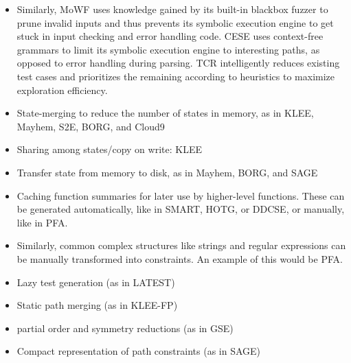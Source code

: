 \documentclass{article}
\begin{document}
\begin{multicols}{2}
\begin{itemize}
        \item Similarly, MoWF\cite{MoWF} uses knowledge gained by its built-in blackbox fuzzer to prune invalid inputs and thus prevents its symbolic execution engine to get stuck in input checking and error handling code. CESE\cite{CESE} uses context-free grammars to limit its symbolic execution engine to interesting paths, as opposed to error handling during parsing. TCR\cite{TCR} intelligently reduces existing test cases and prioritizes the remaining according to heuristics to maximize exploration efficiency.
        \item State-merging to reduce the number of states in memory, as in KLEE\cite{KLEE}, Mayhem\cite{Mayhem}, S2E\cite{S2E}, BORG\cite{BORG}, and Cloud9\cite{Cloud9}
        \item Sharing among states/copy on write: KLEE\cite{KLEE}
        \item Transfer state from memory to disk, as in Mayhem\cite{Mayhem}, BORG\cite{BORG}, and SAGE\cite{SAGE}
        \item Caching function summaries for later use by higher-level functions. These can be generated automatically, like in SMART\cite{SMART}, HOTG\cite{HigherOrderTestGeneration}, or DDCSE\cite{DDCSE}, or manually, like in PFA\cite{PFA}.
        \item Similarly, common complex structures like strings and regular expressions can be manually transformed into constraints. An example of this would be PFA\cite{PFA}.
        \item Lazy test generation (as in LATEST\cite{LATEST})
        \item Static path merging (as in KLEE-FP\cite{KLEEFP})
        \item partial order and symmetry reductions (as in GSE\cite{GSE})
        \item Compact representation of path constraints (as in SAGE\cite{SAGE})
    \end{itemize}


\end{multicols}
\end{document}
